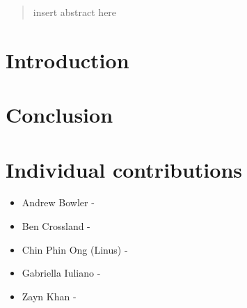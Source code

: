 \documentclass[12pt]{article}
\begin{document}
\begin{abstract}
    insert abstract here
\end{abstract}
\section{Introduction}

\section{Conclusion}

\section{Individual contributions}
\begin{itemize}
    \item Andrew Bowler -
    \item Ben Crossland - 
    \item Chin Phin Ong (Linus) - 
    \item Gabriella Iuliano - 
    \item Zayn Khan - 
\end{itemize}
\end{document}
